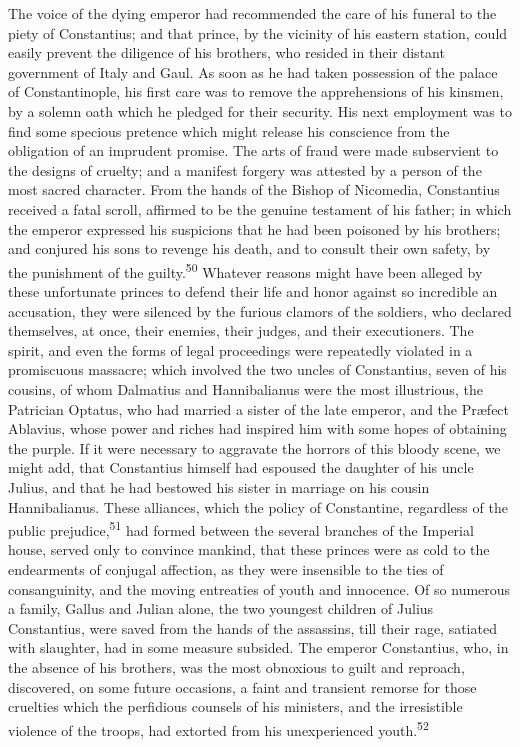 The voice of the dying emperor had recommended the care of his
funeral to the piety of Constantius; and that prince, by the
vicinity of his eastern station, could easily prevent the
diligence of his brothers, who resided in their distant
government of Italy and Gaul. As soon as he had taken possession
of the palace of Constantinople, his first care was to remove the
apprehensions of his kinsmen, by a solemn oath which he pledged
for their security. His next employment was to find some specious
pretence which might release his conscience from the obligation
of an imprudent promise. The arts of fraud were made subservient
to the designs of cruelty; and a manifest forgery was attested by
a person of the most sacred character. From the hands of the
Bishop of Nicomedia, Constantius received a fatal scroll,
affirmed to be the genuine testament of his father; in which the
emperor expressed his suspicions that he had been poisoned by his
brothers; and conjured his sons to revenge his death, and to
consult their own safety, by the punishment of the guilty.\textsuperscript{50}
Whatever reasons might have been alleged by these unfortunate
princes to defend their life and honor against so incredible an
accusation, they were silenced by the furious clamors of the
soldiers, who declared themselves, at once, their enemies, their
judges, and their executioners. The spirit, and even the forms of
legal proceedings were repeatedly violated in a promiscuous
massacre; which involved the two uncles of Constantius, seven of
his cousins, of whom Dalmatius and Hannibalianus were the most
illustrious, the Patrician Optatus, who had married a sister of
the late emperor, and the Præfect Ablavius, whose power and
riches had inspired him with some hopes of obtaining the purple.
If it were necessary to aggravate the horrors of this bloody
scene, we might add, that Constantius himself had espoused the
daughter of his uncle Julius, and that he had bestowed his sister
in marriage on his cousin Hannibalianus. These alliances, which
the policy of Constantine, regardless of the public prejudice,\textsuperscript{51}
had formed between the several branches of the Imperial house,
served only to convince mankind, that these princes were as cold
to the endearments of conjugal affection, as they were insensible
to the ties of consanguinity, and the moving entreaties of youth
and innocence. Of so numerous a family, Gallus and Julian alone,
the two youngest children of Julius Constantius, were saved from
the hands of the assassins, till their rage, satiated with
slaughter, had in some measure subsided. The emperor Constantius,
who, in the absence of his brothers, was the most obnoxious to
guilt and reproach, discovered, on some future occasions, a faint
and transient remorse for those cruelties which the perfidious
counsels of his ministers, and the irresistible violence of the
troops, had extorted from his unexperienced youth.\textsuperscript{52}

